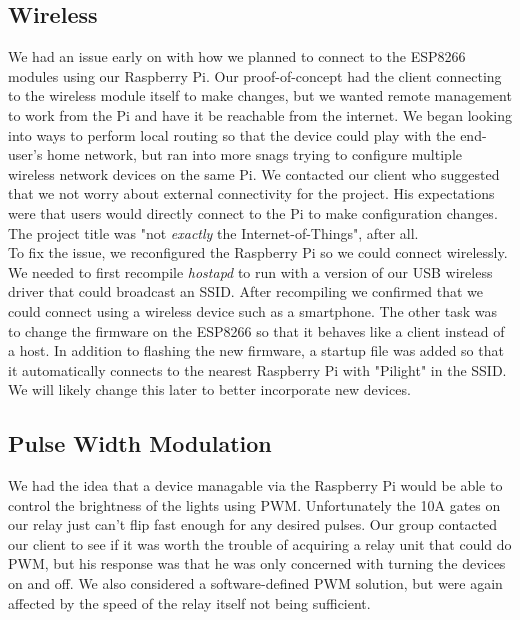 \documentclass[oneside,openright]{book}
\begin{document}
\subsection{Wireless}
We had an issue early on with how we planned to connect to the ESP8266 modules using our Raspberry Pi. Our proof-of-concept had the client connecting to the wireless module itself to make changes, but we wanted remote management to work from the Pi and have it be reachable from the internet. We began looking into ways to perform local routing so that the device could play with the end-user's home network, but ran into more snags trying to configure multiple wireless network devices on the same Pi. We contacted our client who suggested that we not worry about external connectivity for the project. His expectations were that users would directly connect to the Pi to make configuration changes. The project title was "not \textit{exactly} the Internet-of-Things", after all.\\

To fix the issue, we reconfigured the Raspberry Pi so we could connect wirelessly. We needed to first recompile \textit{hostapd} to run with a version of our USB wireless driver that could broadcast an SSID. After recompiling we confirmed that we could connect using a wireless device such as a smartphone. The other task was to change the firmware on the ESP8266 so that it behaves like a client instead of a host. In addition to flashing the new firmware, a startup file was added so that it automatically connects to the nearest Raspberry Pi with "Pilight" in the SSID. We will likely change this later to better incorporate new devices.

\subsection{Pulse Width Modulation}
We had the idea that a device managable via the Raspberry Pi would be able to control the brightness of the lights using PWM. Unfortunately the 10A gates on our relay just can't flip fast enough for any desired pulses. Our group contacted our client to see if it was worth the trouble of acquiring a relay unit that could do PWM, but his response was that he was only concerned with turning the devices on and off. We also considered a software-defined PWM solution, but were again affected by the speed of the relay itself not being sufficient.
\end{document}
